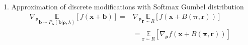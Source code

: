 \documentclass[10pt]{beamer}
\renewcommand{\vec}[1]{\mathbf{#1}}
\DeclareMathOperator*{\argmax}{arg\,max}
\begin{document}
             
    


\begin{frame}{1. Approximation of discrete modifications with Softmax Gumbel distribution}
    \begin{equation}
    \begin{aligned}
    \nabla_{\bm{\rho}} \underset{\vec{b}\sim P_\vec{b}\left(\vec{b} | \bm{\rho}, \lambda\right)}{\mathbb{E}}\left[f\left(\vec{x}+\vec{b}\right)\right] = 
    & \nabla_{\bm{\rho}} \underset{\vec{r} \sim R}{\mathbb{E}}[f(\vec{x}+B(\bm{\pi},\vec{r}))]  \\
    &  = \underset{\vec{r} \sim R}{\mathbb{E}}\left[ \nabla_{\bm{\rho}}  f(\vec{x}+B(\bm{\pi},\vec{r}))\right] 
    \label{eq:permutategradientexpectancy}
    \end{aligned}
    \end{equation}
\end{frame}
\end{document}
